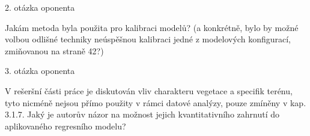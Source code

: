 \documentclass[
	11pt, %
]{beamer}
\begin{document}
\begin{frame}[plain] %
2. otázka oponenta

Jakám metoda byla použita pro kalibraci modelů? (a konkrétně, bylo by možné volbou odlišné techniky neúspěšnou kalibraci jedné z modelových konfigurací, zmiňovanou na straně 42?)




\end{frame}

\begin{frame}[plain] %
3. otázka oponenta

V rešeršní části práce je diskutován vliv charakteru vegetace a specifik terénu, tyto nicméně nejsou přímo použity v rámci datové analýzy, pouze zmíněny v kap. 3.1.7. Jaký je autorův názor na možnost jejich kvantitativního zahrnutí do aplikovaného regresního modelu?


\end{frame}
\end{document}
